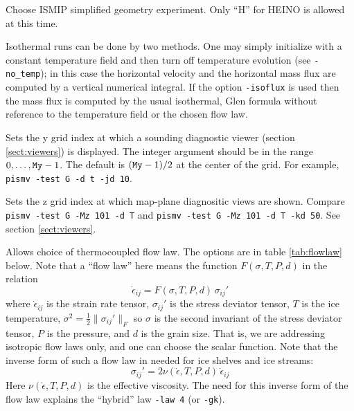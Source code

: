\documentclass[11pt,final]{amsart}
\renewcommand{\t}[1]{\texttt{#1}}
\newcommand{\eps}{\epsilon}
\begin{document}
  Choose ISMIP simplified geometry experiment.  Only ``H'' for HEINO is allowed at this time.

  Isothermal runs can be done by two methods.  One may simply initialize with a constant temperature field and then turn off temperature evolution (see \verb|-no_temp|); in this case the horizontal velocity and the horizontal mass flux are computed by a vertical numerical integral.  If the option \verb|-isoflux| is used then the mass flux is computed by the usual isothermal, Glen formula without reference to the temperature field or the chosen flow law.

  Sets the y grid index at which a sounding diagnostic viewer (section \ref{sect:viewers}) is displayed.  The integer argument should be in the range $0,\dots,\text{\t{My}}-1$.  The default is $(\text{\t{My}}-1)/2$ at the center of the grid.  For example, \verb|pismv -test G -d t -jd 10|.

  Sets the z grid index at which map-plane diagnositic views are shown.  Compare \verb|pismv -test G -Mz 101 -d T| and \verb|pismv -test G -Mz 101 -d T -kd 50|.  See section \ref{sect:viewers}.

  Allows choice of thermocoupled flow law.  The options are in table \ref{tab:flowlaw} below.  Note that a ``flow law'' here means the function $F(\sigma,T,P,d)$ in the relation
	$$\dot \eps_{ij} = F(\sigma,T,P,d)\, \sigma_{ij}'$$
where $\dot \eps_{ij}$ is the strain rate tensor, $\sigma_{ij}'$ is the stress deviator tensor, $T$ is the ice temperature, $\sigma^2 = \frac{1}{2} \|\sigma_{ij}'\|_F$ so $\sigma$ is the second invariant of the stress deviator tensor, $P$ is the pressure, and $d$ is the grain size.  That is, we are addressing isotropic flow laws only, and one can choose the scalar function.  Note that the inverse form of such a flow law in needed for ice shelves and ice streams:
	$$\sigma_{ij}' = 2 \nu(\dot\eps,T,P,d)\,\dot \eps_{ij} $$
Here $\nu(\dot \eps,T,P,d)$ is the effective viscosity.  The need for this inverse form of the flow law explains the ``hybrid'' law \verb|-law 4| (or \verb|-gk|).
\end{document}
